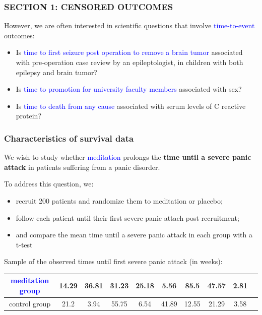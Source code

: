 \documentclass[12pt, 
hyperref={colorlinks=true, linkcolor=blue, urlcolor=cyan},dvipsnames]{beamer}
\begin{document}
\begin{frame}
\frametitle{SECTION 1: CENSORED OUTCOMES}
However, we are often interested in scientific questions that involve \textcolor{blue}{time-to-event} outcomes:
\begin{itemize}
\item Is \textcolor{blue}{time to first seizure post operation to remove a brain tumor} associated with pre-operation case review by an epileptologist, in children with both epilepsy and brain tumor?
\item Is \textcolor{blue}{time to promotion for university faculty members} associated with sex?
\item Is \textcolor{blue}{time to death from any cause} associated with serum levels of C reactive protein?
\end{itemize}
\end{frame}

\begin{frame}
\frametitle{Characteristics of survival data}
We wish to study whether \textcolor{blue}{meditation} prolongs the \textbf{time until a severe panic attack} in patients suffering from a panic disorder.

To address this question, we: \vspace{-0.3cm}
\begin{itemize}
\item recruit 200 patients and randomize them to meditation or placebo;
\item follow each patient until their first severe panic attach post recruitment;
\item and compare the mean time until a severe panic attack in each group with a t-test
\end{itemize}

{\fontsize{10pt}{7.2}\selectfont
Sample of the observed times until first severe panic attack (in weeks):
\hspace*{-1cm}\begin{tabular}{|c|c|c|c|c|c|c|c|c|c|}
\hline
\textcolor{blue}{meditation group} & 14.29 & 36.81 & 31.23 & 25.18 & 5.56 & 85.5 & 47.57 & 2.81  \\
\hline
control group & 21.2 & 3.94 & 55.75 & 6.54 & 41.89 & 12.55 & 21.29 & 3.58 \\
\hline
\end{tabular}
}
\end{frame}
\end{document}
